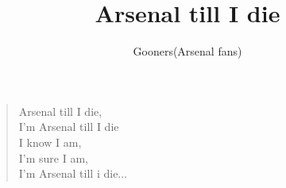 \documentclass[a4paper,12pt]{article}
\title{Arsenal till I die}
\author{Gooners(Arsenal fans)}
\date{}
\begin{document}
	
	\maketitle
	
	\begin{verse}
		
		Arsenal till I die, \\
		I'm Arsenal till I die \\ 
		I know I am, \\
		I'm sure I am, \\
		I'm Arsenal till i die$\ldots$
		
	\end{verse}
	
\end{document}
